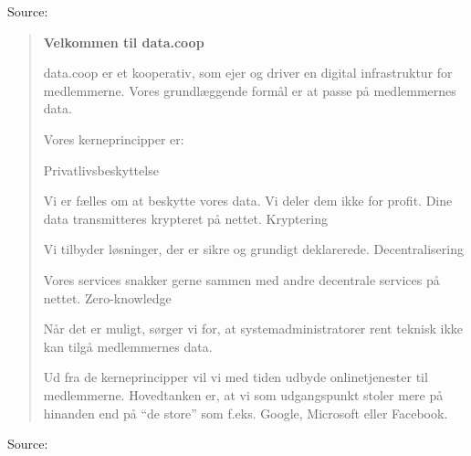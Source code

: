 \documentclass[Screen16to9,17pt]{foils}
\begin{document}
Source:  




\begin{quote}{\bf \large
Velkommen til data.coop}

data.coop er et kooperativ, som ejer og driver en digital infrastruktur for medlemmerne. Vores grundlæggende formål er at passe på medlemmernes data.

Vores kerneprincipper er:

Privatlivsbeskyttelse
\begin{list2}
\item Vi er fælles om at beskytte vores data. Vi deler dem ikke for profit. Dine data transmitteres krypteret på nettet.
Kryptering
\item Vi tilbyder løsninger, der er sikre og grundigt deklarerede.
Decentralisering
\item Vores services snakker gerne sammen med andre decentrale services på nettet.
Zero-knowledge
\item Når det er muligt, sørger vi for, at systemadministratorer rent teknisk ikke kan tilgå medlemmernes data.
\end{list2}

Ud fra de kerneprincipper vil vi med tiden udbyde onlinetjenester til medlemmerne. Hovedtanken er, at vi som udgangspunkt stoler mere på hinanden end på “de store” som f.eks. Google, Microsoft eller Facebook.

\end{quote}

Source:  

\end{document}
